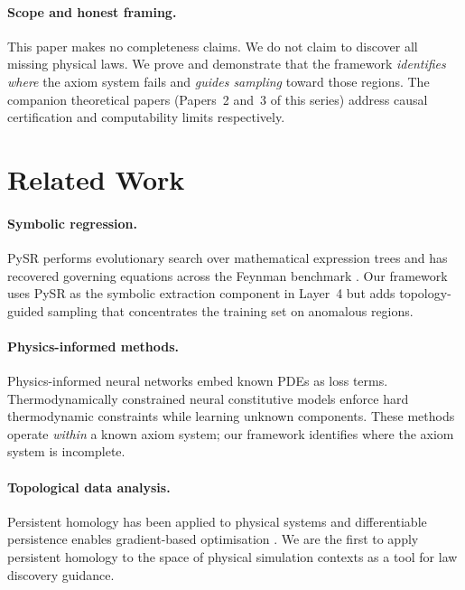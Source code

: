 \documentclass[twoside,11pt]{article}
\begin{document}
\paragraph{Scope and honest framing.}
This paper makes no completeness claims. We do not claim to discover
all missing physical laws. We prove and demonstrate that the framework
\emph{identifies where} the axiom system fails and \emph{guides
sampling} toward those regions. The companion theoretical papers
(Papers~2 and~3 of this series) address causal certification and
computability limits respectively.

\section{Related Work}
\label{sec:related}

\paragraph{Symbolic regression.}
PySR \citep{cranmer2023pysr} performs evolutionary search over
mathematical expression trees and has recovered governing equations
across the Feynman benchmark \citep{udrescu2020ai}. Our framework uses
PySR as the symbolic extraction component in Layer~4 but adds
topology-guided sampling that concentrates the training set on
anomalous regions.

\paragraph{Physics-informed methods.}
Physics-informed neural networks \citep{raissi2019physics} embed
known PDEs as loss terms. Thermodynamically constrained neural
constitutive models \citep{linden2023physics} enforce hard
thermodynamic constraints while learning unknown components. These
methods operate \emph{within} a known axiom system; our framework
identifies where the axiom system is incomplete.

\paragraph{Topological data analysis.}
Persistent homology \citep{edelsbrunner2010computational} has been
applied to physical systems \citep{topaz2015topological} and
differentiable persistence enables gradient-based optimisation
\citep{adams2017persistence}. We are the first to apply persistent
homology to the space of physical simulation contexts as a tool for
law discovery guidance.
\end{document}
